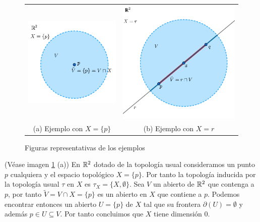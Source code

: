 \begin{figure}[h]
\begin{tabular}{cc}
\includegraphics[scale=0.5]{./img/ejemplo-dimension-1.png} &   \includegraphics[scale=0.45]{./img/ejemplo-dimension-2.png} \\
(a) Ejemplo con $X=\{p\}$ & (b) Ejemplo con $X=r$ \\[6pt]
\end{tabular}
\caption{Figuras representativas de los ejemplos}
\label{fig:ejemplos}
\end{figure}


\begin{ejemplo}
\label{ej:dimension-1}
(Véase imagen \ref{fig:ejemplos} (a))
En $\mathbb{R}^2$ dotado de la topología usual consideramos un punto $p$ cualquiera y el espacio topológico $X=\{p\}$. Por tanto la topología inducida por la topología usual $\tau$ en $X$ es $\tau_X=\{X,\emptyset\}$. Sea $V$ un abierto de $\mathbb{R}^2$ que contenga a $p$, por tanto $\tilde{V} = V \cap X = \{p\}$ es un abierto en $X$ que contiene a $p$. Podemos encontrar entonces un abierto $U=\{p\}$ de $X$ tal que su frontera $\partial(U)=\emptyset$ y además $p\in U \subseteq V$. Por tanto concluimos que $X$ tiene dimensión 0.
\end{ejemplo}

